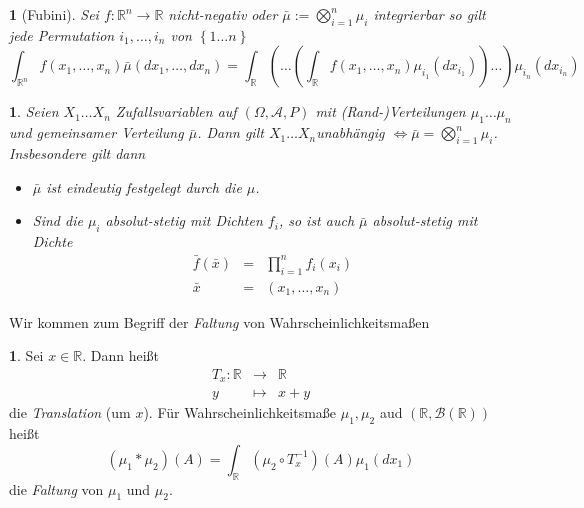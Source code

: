 \documentclass[10pt,a4paper]{report}
\numberwithin{equation}{section}
\numberwithin{figure}{section}
\theoremstyle{plain}
\theoremstyle{definition}
\newtheorem{defn}[thm]{\protect\definitionname}
\theoremstyle{remark}
\theoremstyle{plain}
\newtheorem{prop}[thm]{\protect\propositionname}
\newtheorem*{prop*}{\protect\propositionname}
\providecommand{\definitionname}{Definition}
\providecommand{\propositionname}{Satz}
\newcommand{\1}{ \mathbb{1} } %
\begin{document}
\begin{prop*}[Fubini] 
  Sei $f:\mathbb{R}^{n}\to\mathbb{R}$ nicht-negativ oder $\bar{\mu}:=\bigotimes_{i=1}^{n}\mu_{i}$
  integrierbar so gilt jede Permutation $i_{1},\ldots,i_{n}$ von $\left\{ 1\ldots n\right\} $
  \[
  \int_{\mathbb{R}^{n}}f\left(x_{1},\ldots,x_{n}\right)\bar{\mu}\left(dx_{1},\ldots,dx_{n}\right)=\int_{\mathbb{R}}\left(\ldots\left(\int_{\mathbb{R}}f\left(x_{1},\ldots,x_{n}\right)\mu_{i_{1}}\left(dx_{i_{1}}\right)\right)\ldots\right)\mu_{i_{n}}\left(dx_{i_{n}}\right)
  \]
\end{prop*}
\begin{prop} %
  Seien $X_{1}\ldots X_{n}$ Zufallsvariablen auf $\left(\Omega,\mathcal{A},P\right)$
  mit (Rand-)Verteilungen $\mu_{1}\ldots\mu_{n}$ und gemeinsamer Verteilung
  $\bar{\mu}$. Dann gilt $X_{1}\ldots X_{n}$unabhängig $\Leftrightarrow\bar{\mu}=\bigotimes_{i=1}^{n}\mu_{i}$.
  Insbesondere gilt dann
  \begin{itemize}
  \item [{i)}] $\bar{\mu}$ ist eindeutig festgelegt durch die $\mu$. 
  \item [{ii)}] Sind die $\mu_{i}$ absolut-stetig mit Dichten $f_{i}$,
    so ist auch $\bar{\mu}$ absolut-stetig mit Dichte
    \begin{eqnarray*}
      \bar{f}\left(\bar{x}\right) & = & \prod_{i=1}^{n}f_{i}\left(x_{i}\right)\\
      \bar{x} & = & \left(x_{1},\ldots,x_{n}\right)
    \end{eqnarray*}

  \end{itemize}
\end{prop}
Wir kommen zum Begriff der \emph{Faltung} von Wahrscheinlichkeitsmaßen
\begin{defn} %
  Sei $x\in\mathbb{R}$. Dann heißt 
  \begin{eqnarray*}
    T_{x}:\mathbb{R} & \to & \mathbb{R}\\
    y & \mapsto & x+y
  \end{eqnarray*}
  die \emph{Translation} (um $x$). Für Wahrscheinlichkeitsmaße $\mu_{1},\mu_{2}$
  aud $\left(\mathbb{R},\mathcal{B}\left(\mathbb{R}\right)\right)$
  heißt 
  \[
  \left(\mu_{1}*\mu_{2}\right)\left(A\right)=\int_{\mathbb{R}}\left(\mu_{2}\circ T_{x}^{-1}\right)\left(A\right)\mu_{1}\left(dx_{1}\right)
  \]
  die \emph{Faltung} von $\mu_{1}$ und $\mu_{2}$.
\end{defn}
\end{document}
